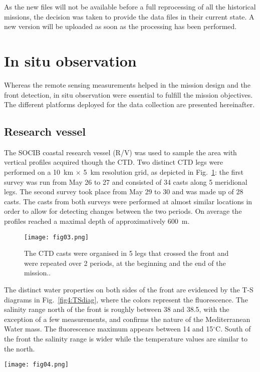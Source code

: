 \documentclass[essd,manuscript]{copernicus}
\begin{document}
As the new files will not be available before a full reprocessing of all the historical missions, the decision was taken to provide the data files in their current state. A new version will be uploaded as soon as the processing has been performed.

\section{In situ observation}

Whereas the remote sensing measurements helped in the mission design and the front detection, in situ observation were essential to fulfill the mission objectives. The different platforms deployed for the data collection are presented hereinafter.

\subsection{Research vessel}

The SOCIB coastal research vessel (R/V) was used to sample the area with vertical profiles acquired though the CTD. Two distinct CTD legs were performed on a 10~km $\times$ 5~km resolution grid, as depicted in Fig.~\ref{fig3:CTD}: the first survey was run from May 26 to 27 and consisted of 34 casts along 5 meridional legs. The second survey took place from May 29 to 30 and was made up of 28 casts. The casts from both surveys were performed at almost similar locations in order to allow for detecting changes between the two periods. On average the profiles reached a maximal depth of approximatively 600~m.

\begin{figure}[ht]
\texttt{[image: fig03.png]}
\caption{The CTD casts were organised in 5 legs that crossed the front and were repeated over 2 periods, at the beginning and the end of the mission.\label{fig3:CTD}.}
\end{figure}

The distinct water properties on both sides of the front are evidenced by the T-S diagrams in Fig.~\ref{fig4:TSdiag}, where the colors represent the fluorescence. The salinity range north of the front is roughly between 38 and 38.5, with the exception of a few measurements, and confirms the nature of the Mediterranean Water mass. The fluorescence maximum appears between 14 and 15$^{\circ}$C. South of the front the salinity range is wider while the temperature values are similar to the north.

\begin{figure*}[ht]
\texttt{[image: fig04.png]}
\caption{The T-S diagrams are shown separately for the casts located north and south of the front (broad, dashed line) \label{fig4:TSdiag}.}
\end{figure*}
\end{document}
